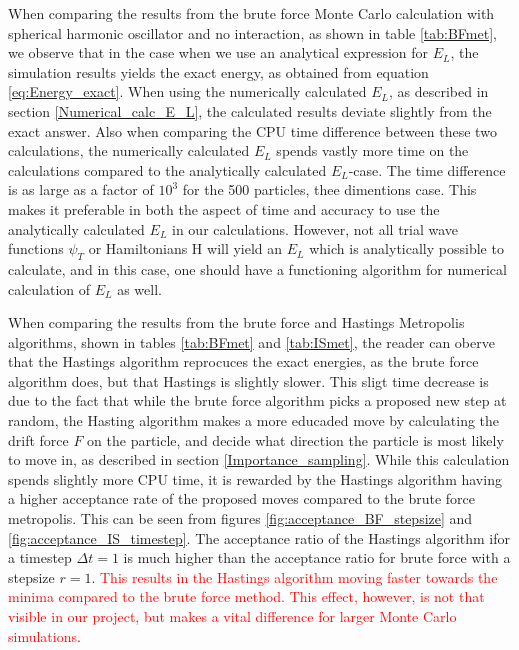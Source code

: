 \documentclass[norsk,a4paper,12pt]{article}
\begin{document}
When comparing the results from the brute force Monte Carlo calculation with spherical harmonic oscillator and no interaction, as shown in table \ref{tab:BFmet}, we observe that in the case when we use an analytical expression for $E_L$, the simulation results yields the exact energy, as obtained from equation \ref{eq:Energy_exact}. When using the numerically calculated $E_L$, as described in section \ref{Numerical_calc_E_L}, the calculated results deviate slightly from the exact answer. Also when comparing the CPU time difference between these two calculations, the numerically calculated $E_L$ spends vastly more time on the calculations compared to the analytically calculated $E_L$-case. The time difference is as large as a factor of $10^3$ for the 500 particles, thee dimentions case. This makes it preferable in both the aspect of time and accuracy to use the analytically calculated $E_L$ in our calculations. However, not all trial wave functions $\psi_T$ or Hamiltonians H will yield an $E_L$ which is analytically possible to calculate, and in this case, one should have a functioning algorithm for numerical calculation of $E_L$ as well.
\par 
\vspace{3mm}

When comparing the results from the brute force and Hastings Metropolis algorithms, shown in tables \ref{tab:BFmet} and \ref{tab:ISmet}, the reader can oberve that the Hastings algorithm reprocuces the exact energies, as the brute force algorithm does, but that Hastings is slightly slower. This sligt time decrease is due to the fact that while the brute force algorithm picks a proposed new step at random, the Hasting algorithm makes a more educaded move by calculating the drift force $F$ on the particle, and decide what direction the particle is most likely to move in, as described in section \ref{Importance_sampling}. While this calculation spends slightly more CPU time, it is rewarded by the Hastings algorithm having a higher acceptance rate of the proposed moves compared to the brute force metropolis. This can be seen from figures \ref{fig:acceptance_BF_stepsize} and \ref{fig:acceptance_IS_timestep}. The acceptance ratio of the Hastings algorithm ifor a timestep $\Delta t =1$ is much higher than the acceptance ratio for brute force with a stepsize $r=1$. \textcolor{red}{This results in the Hastings algorithm moving faster towards the minima compared to the brute force method. This effect, however, is not that visible in our project, but makes a vital difference for larger Monte Carlo simulations}.
\par 
\vspace{3mm}
\end{document}
